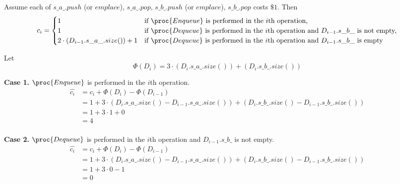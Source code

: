 Assume each of $s\_a\_.push$ (or $emplace$), $s\_a\_.pop$, 
$s\_b\_.push$ (or $emplace$), $s\_b\_.pop$ costs $\$1$.
Then
\begin{equation*}
    c_i = 
    \begin{cases}
        1 & \text{if $\proc{Enqueue}$ is performed in the $i$th operation,} \\
        1 & \text{if $\proc{Dequeue}$ is performed in the $i$th operation
            and $D_{i-1}.s\_b\_$ is not empty,} \\
        2 \cdot (D_{i-1}.s\_a\_.size()) + 1 
            & \text{if $\proc{Dequeue}$ is performed in the $i$th operation
            and $D_{i-1}.s\_b\_$ is empty} \\
    \end{cases}
\end{equation*}

Let 
\begin{equation*}
    \Phi(D_i) = 3 \cdot (D_i.s\_a\_.size()) + (D_i.s\_b\_.size())
\end{equation*}

\textbf{Case 1.} 
$\proc{Enqueue}$ is performed in the $i$th operation.
\begin{equation*}
\begin{split}
    \hat{c_i} & = c_i + \Phi(D_i) - \Phi(D_{i-1}) \\
    & = 1 + 3 \cdot (D_i.s\_a\_.size() - D_{i-1}.s\_a\_.size()) 
        + (D_i.s\_b\_.size() - D_{i-1}.s\_b\_.size())\\
    & = 1 + 3 \cdot 1 + 0 \\
    & = 4 \\
\end{split}
\end{equation*}

\textbf{Case 2.} 
$\proc{Dequeue}$ is performed in the $i$th operation
and $D_{i-1}.s\_b\_$ is not empty.
\begin{equation*}
\begin{split}
    \hat{c_i} & = c_i + \Phi(D_i) - \Phi(D_{i-1}) \\
    & = 1 + 3 \cdot (D_i.s\_a\_.size() - D_{i-1}.s\_a\_.size()) 
        + (D_i.s\_b\_.size() - D_{i-1}.s\_b\_.size())\\
    & = 1 + 3 \cdot 0 - 1 \\
    & = 0 \\
\end{split}
\end{equation*}

